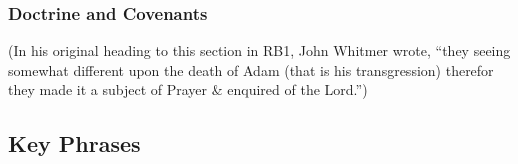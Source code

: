 	\subsubsection{Doctrine and Covenants} %
		\label{TRANSGRESSION-DC}
	
		
		\begin{compactdesc}
			\item[{\hyperref[DC29]{DC 29}}] (In his original heading to this section in RB1, John Whitmer wrote, ``they seeing somewhat different upon the death of Adam (that is his transgression) therefor they made it a subject of Prayer \& enquired of the Lord.'')
		\end{compactdesc}
		
	
		
		
\subsection{Key Phrases} %
	\label{TRANSGRESSION-PHRASES}

